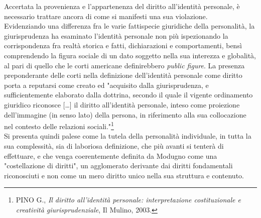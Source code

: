 Accertata la provenienza e l'appartenenza del diritto all'identità personale, 
è necessario trattare ancora di come si manifesti una sua violazione.
\\Evidenziando una differenza fra le varie fattispecie giuridiche della personalità, la giurisprudenza ha esaminato l'identità personale non più ispezionando la corrispondenza fra realtà storica e fatti, dichiarazioni e comportamenti, bensì comprendendo la figura sociale di un dato soggetto nella sua interezza e globalità, al pari di quello che le corti americane definirebbero \textit{public figure}.
La presenza preponderante delle corti nella definizione dell'identità personale come diritto porta a reputarsi come creato ed "acquisito dalla giurisprudenza, e sufficientemente elaborato dalla dottrina, secondo il quale il vigente ordinamento giuridico riconosce […] il diritto all’identità personale, inteso come proiezione dell’immagine (in senso lato) della persona, in riferimento alla sua collocazione nel contesto delle relazioni sociali."\footnote{PINO G., \textit{Il diritto all'identità personale: interpretazione costituzionale e creatività giurisprudenziale}, Il Mulino, 2003.}
\\Si presenta quindi palese come la tutela della personalità individuale, in tutta la sua complessità, sia di laboriosa definizione, che più avanti si tenterà di effettuare, e che venga coerentemente definita da Modugno come una "costellazione di diritti", un agglomerato derivante dai diritti fondamentali riconosciuti e non come un mero diritto unico nella sua struttura e contenuto.

